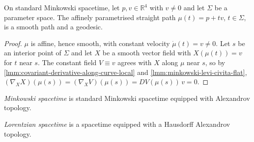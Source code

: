 \begin{lemma}
    \label{lmm:minkowski-lines-are-geodesics}
    \leanok
    On standard Minkowski spacetime, let $p, v \in \mathbb{R}^4$ with $v \neq 0$ and let $\Sigma$ be a parameter space. The affinely parametrised straight path $\mu(t) = p + t v$, $t \in \Sigma$, is a smooth path and a geodesic.
\end{lemma}
\begin{proof}
    \leanok
    $\mu$ is affine, hence smooth, with constant velocity $\dot\mu(t) = v \neq 0$. Let $s$ be an interior point of $\Sigma$ and let $X$ be a smooth vector field with $X(\mu(t)) = v$ for $t$ near $s$. The constant field $V \equiv v$ agrees with $X$ along $\mu$ near $s$, so by \ref{lmm:covariant-derivative-along-curve-local} and \ref{lmm:minkowski-levi-civita-flat}, $(\nabla_X X)(\mu(s)) = (\nabla_X V)(\mu(s)) = DV(\mu(s))\,v = 0$.
\end{proof}

\begin{definition}
    \label{def:minkowski-spacetime}
    \leanok
    \textit{Minkowski spacetime} is standard Minkowski spacetime equipped with Alexandrov topology.
\end{definition}

\medskip

\begin{definition}
    \label{def:lorentzian-spacetime}
    \leanok
    \textit{Lorentzian spacetime} is a spacetime equipped with a Hausdorff Alexandrov topology.
\end{definition}

\medskip

